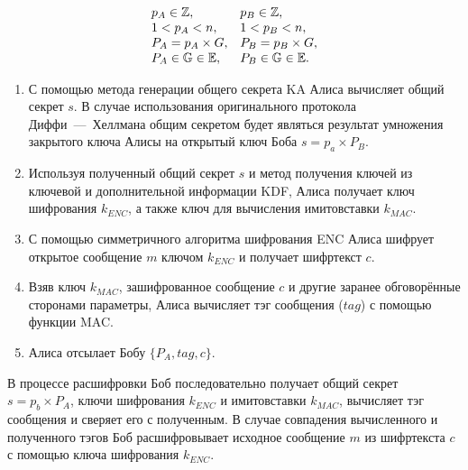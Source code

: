\[ \begin{array}{ll}
	p_A \in \mathbb{Z}, & p_B \in \mathbb{Z}, \\
	1 < p_A < n, & 1 < p_B < n, \\
	P_A = p_A \times G, & P_B = p_B \times G, \\
	P_A \in \mathbb{G} \in \mathbb{E}, & P_B \in \mathbb{G} \in \mathbb{E}.\\
\end{array} \]

\begin{enumerate}
	\item С помощью метода генерации общего секрета KA Алиса вычисляет общий секрет $s$. В случае использования оригинального протокола Диффи~---~Хеллмана общим секретом будет являться результат умножения закрытого ключа Алисы на открытый ключ Боба $s = p_a \times P_B$.
	\item Используя полученный общий секрет $s$ и метод получения ключей из ключевой и дополнительной информации KDF, Алиса получает ключ шифрования $k_{ENC}$, а также ключ для вычисления имитовставки $k_{MAC}$.
	\item С помощью симметричного алгоритма шифрования ENC Алиса шифрует открытое сообщение $m$ ключом $k_{ENC}$ и получает шифртекст $c$.
	\item Взяв ключ $k_{MAC}$, зашифрованное сообщение $c$ и другие заранее обговорённые сторонами параметры, Алиса вычисляет тэг сообщения ($tag$) с помощью функции MAC.
	\item Алиса отсылает Бобу $\{P_A, tag, c\}$.
\end{enumerate}

В процессе расшифровки Боб последовательно получает общий секрет $s = p_b \times P_A$, ключи шифрования $k_{ENC}$ и имитовставки $k_{MAC}$, вычисляет тэг сообщения и сверяет его с полученным. В случае совпадения вычисленного и полученного тэгов Боб расшифровывает исходное сообщение $m$ из шифртекста $c$ с помощью ключа шифрования $k_{ENC}$.
